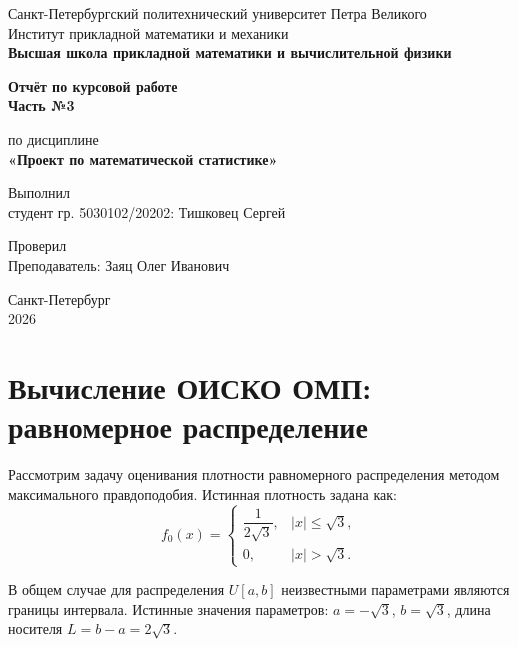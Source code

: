 \documentclass[12pt,a4paper]{article}
\begin{document}

\begin{titlepage}
  \begin{center}
    {Санкт-Петербургский политехнический университет Петра Великого\\
    Институт прикладной математики и механики\\[0.5em]
    \textbf{Высшая школа прикладной математики и вычислительной физики}}
    
    \vfill
    
    {\LARGE\bfseries Отчёт по курсовой работе\\ Часть №3\par}
    \vspace{1em}
    {\Large по дисциплине\\[0.3em] {\bfseries «Проект по математической статистике»}}
    
    \vfill
    
    \begin{flushright}
        Выполнил\\
        студент гр. 5030102/20202: Тишковец Сергей
    \end{flushright}
    
    \begin{flushright}
        Проверил\\
        Преподаватель: Заяц Олег Иванович
    \end{flushright}
    
    \vfill
    Санкт-Петербург\\
    2026
  \end{center}
\end{titlepage}

\setcounter{page}{2}
\newpage

\section*{Вычисление ОИСКО ОМП: равномерное распределение}

Рассмотрим задачу оценивания плотности равномерного распределения методом максимального правдоподобия. Истинная плотность задана как:
\[
f_0(x) = 
\begin{cases}
\dfrac{1}{2\sqrt{3}}, & |x| \le \sqrt{3}, \\
0, & |x| > \sqrt{3}.
\end{cases}
\]

В общем случае для распределения $U[a, b]$ неизвестными параметрами являются границы интервала. Истинные значения параметров: $a = -\sqrt{3}$, $b = \sqrt{3}$, длина носителя $L = b - a = 2\sqrt{3}$.
\end{document}
